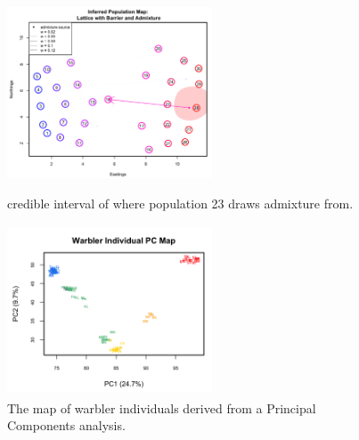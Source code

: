 \documentclass[12pt]{article}
\newcommand{\gc}[1]{{\em \color{blue} #1}}
\begin{document}
\begin{figure}[ht!]
	\centering
		{\includegraphics[width=2.4in,height=2in]{figs/sims/GeoGenMap_barr_inland_admixture_2.png}}
	\caption{credible interval of where population 23 draws admixture from.}
\label{sfig:barr_inland_ad_credset}
\end{figure}


\begin{figure}
	\centering
	\includegraphics[width=2.4in,height=2in]{figs/warblers/warb_ind_PC_map.png}
	\caption{The map of warbler individuals derived from a Principal Components analysis.}\label{warb_ind_PC_map}
\end{figure}

\end{document}
